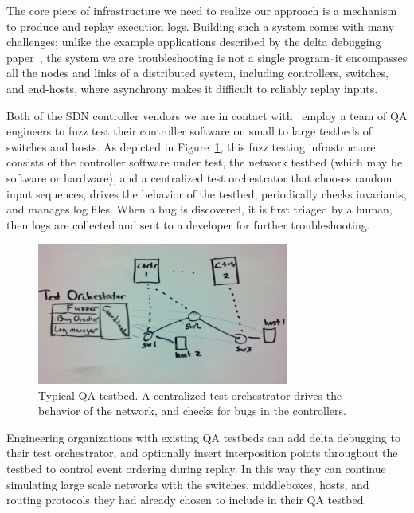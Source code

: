 The core piece of infrastructure we need to realize our approach is a
mechanism to produce and replay execution logs. Building such a system comes
with many challenges; unlike the example applications described
by the delta debugging paper~\cite{Zeller:1999:YMP:318773.318946}, the system we are troubleshooting is not a
single program--it encompasses all the nodes and links of a distributed system,
including controllers, switches, and end-hosts, where asynchrony
makes it difficult to reliably replay inputs.

Both of the SDN controller vendors we are in contact with~\cite{nicirahomepage,bigswitch} employ a team of QA
engineers to fuzz test their controller software on small to large testbeds of switches and hosts.
As depicted in Figure~\ref{fig:qa_cluster}, this fuzz testing infrastructure
consists of the controller software under test, the network testbed (which may
be software or hardware), and a centralized
test orchestrator
that chooses random input sequences, drives the behavior of the testbed,
periodically checks invariants, and manages log files. When a bug is discovered, it is first triaged
by a human, then logs are collected and sent to a developer for further troubleshooting.

\begin{figure}[t]
    \includegraphics[width=3.25in]{../diagrams/architecture/qa_cluster.jpg}
    \caption[]{\label{fig:qa_cluster} Typical QA testbed. A centralized test
    orchestrator drives the behavior of the network, and checks for bugs in
    the controllers.}
\end{figure}

Engineering organizations with existing
QA testbeds can add delta debugging to their test
orchestrator, and optionally insert interposition points throughout the
testbed to control event ordering during replay.
In this way they can continue simulating large scale networks with
the switches, middleboxes, hosts, and routing protocols they had already
chosen to include in their QA testbed.

